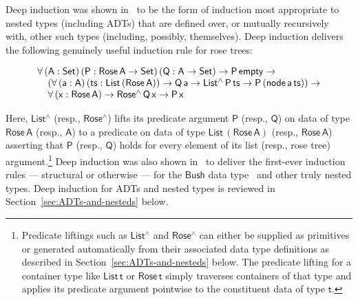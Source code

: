 \documentclass[9pt]{entcs}
\begin{document}
Deep induction was shown in~\cite{jp20} to be the form of induction
most appropriate to nested types (including ADTs) that are defined
over, or mutually recursively with, other such types (including,
possibly, themselves). Deep induction delivers the following genuinely
useful induction rule for rose trees:

\vspace*{-0.075in}

\begin{equation}\label{eq:rose}
\begin{array}{l}
\mathsf{\forall \,(A : Set)\,(P : Rose\,A \to Set)\,(Q : A \to Set)
  \to P\,empty \to}\\ 
\mathsf{\hspace*{0.15in}(\forall \,(a : A)\, (ts :
  List\,(Rose\,A))\to Q\,a \to List^\land\,P\,ts \to P\,(node\,a\,ts)) \to}\\
\mathsf{\hspace*{0.15in}\forall \,(x :
  Rose\,A) \to Rose^\land\,Q\, x \to P\,x} 
\end{array}
\end{equation}

\noindent
Here, $\mathsf{List^\land}$ (resp., $\mathsf{Rose^\land}$) lifts its
predicate argument $\mathsf{P}$ (resp., $\mathsf{Q}$) on data of type
$\mathsf{Rose\,A}$ (resp., $\mathsf{A}$) to a predicate on data of
type $\mathsf{List\,(Rose\,A)}$ (resp., $\mathsf{Rose\,A}$) asserting
that $\mathsf{P}$ (resp., $\mathsf{Q}$) holds for every element of its
list (resp., rose tree) argument.\footnote{Predicate liftings such as
  $\mathsf{List^\land}$ and $\mathsf{Rose^\land}$ can either be
  supplied as primitives or generated automatically from their
  associated data type definitions as described in
  Section~\ref{sec:ADTs-and-nesteds} below. The predicate lifting for
  a container type like $\mathsf{List\,t}$ or $\mathsf{Rose\,t}$
  simply traverses containers of that type and applies its predicate
  argument pointwise to the constituent data of type $\mathsf{t}$.}
Deep induction was also shown in~\cite{jp20} to
deliver the first-ever induction rules --- structural or otherwise ---
for the $\mathsf{Bush}$ data type~\cite{bm98} and other truly nested
types. Deep induction for ADTs and nested types is reviewed in
Section~\ref{sec:ADTs-and-nesteds} below.
\end{document}
